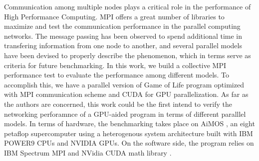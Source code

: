 
Communication among multiple nodes plays a critical role in the performance of High Performance Computing. MPI \cite{clarke1994mpi} offers a great number of libraries to maximize and test the communication performance in the parallel computing networks. The message passing has been observed to spend additional time in transfering information from one node to another, and several parallel models have been devised to properly describe the phenomenon, which in terms serve as criteria for future benchmarking. In this work, we build a collective MPI performance test to evaluate the performance among different models. To accomplish this, we have a parallel version of Game of Life program optimized with MPI communication scheme and CUDA for GPU parallelization. As far as the authors are concerned, this work could be the first intend to verify the networking perforamnce of a GPU-aided program in terms of different paralllel models. In terms of hardware, the benchmarking takes place on AiMOS \cite{aimos}, an eight petaflop supercomputer using a heterogenous system architecture built with IBM POWER9 CPUs and NVIDIA GPUs. On the software side, the program relies on IBM Spectrum MPI and NVidia CUDA math library \cite{aimosibm}.
